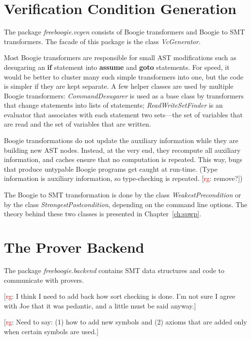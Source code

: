 \documentclass{llncs}
\newcommand{\rg}[1]{{\small [\textcolor{red}{rg}: #1]}}
\begin{document}
\section{Verification Condition Generation} %

The package \textit{freeboogie.vcgen} consists of Boogie
transformers and Boogie to SMT transformers. The facade of this
package is the class \textit{VcGenerator}.

Most Boogie transformers are responsible for small AST
modifications such as desugaring an \textbf{if} statement
into \textbf{assume} and \textbf{goto} statements. For speed,
it would be better to cluster many such simple transformers
into one, but the code is simpler if they are kept
separate. A few helper classes are used by multiple Boogie
transformers: \textit{CommandDesugarer} is used as a base class
by transformers that change statements into lists of statements;
\textit{ReadWriteSetFinder} is an evaluator that associates with
each statement two sets---the set of variables that are read and
the set of variables that are written.

Boogie transformations do not update the auxiliary information
while they are building new AST nodes. Instead, at the very end,
they recompute all auxiliary information, and caches ensure that
no computation is repeated. This way, bugs that produce untypable
Boogie programs get caught at run-time. (Type information is
auxiliary information, so type-checking is repeated. \rg{remove?})

The Boogie to SMT transformation is done by the
class \textit{WeakestPrecondition} or by the class
\textit{StrongestPostcondition}, depending on the command line
options. The theory behind these two classes is presented in
Chapter~\ref{ch:spwp}.

\section{The Prover Backend} %
\label{sec:design.backend}

The package \textit{freeboogie.backend} contains SMT data
structures and code to communicate with provers.

\rg{I think I need to add back how sort checking is done. I'm not sure I
agree with Joe that it was pedantic, and a little must be said anyway.}

\rg{Need to say: (1) how to add new symbols and (2) axioms that are added
only when certain symbols are used.}
\end{document}
